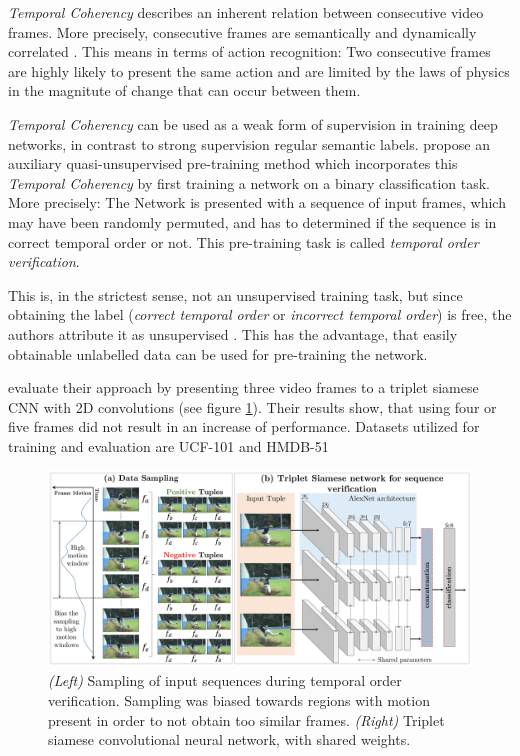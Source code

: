 \textit{Temporal Coherency} describes an inherent relation between consecutive video frames.
More precisely, consecutive frames are semantically and dynamically correlated \cite{herath_going_2016}.
This means in terms of action recognition: Two consecutive frames are highly likely to present the same action and are limited by the laws of physics in the magnitute of change that can occur between them.

\textit{Temporal Coherency} can be used as a weak form of supervision in training deep networks, in contrast to strong supervision regular semantic labels.
\textcite{misra_shuffle_2016} propose an auxiliary quasi-unsupervised pre-training method which incorporates this \textit{Temporal Coherency} by first training a network on a binary classification task.
More precisely: The Network is presented with a sequence of input frames, which may have been randomly permuted, and has to determined if the sequence is in correct temporal order or not.
This pre-training task is called \textit{temporal order verification}.

This is, in the strictest sense, not an unsupervised training task, but since obtaining the label (\textit{correct temporal order} or \textit{incorrect temporal order}) is free, the authors attribute it as unsupervised \cite{misra_shuffle_2016}.
This has the advantage, that easily obtainable unlabelled data can be used for pre-training the network.

\textcite{misra_shuffle_2016} evaluate their approach by presenting three video frames to a triplet siamese CNN with 2D convolutions (see figure \ref{fig:shufflelearn_approach}).
Their results show, that using four or five frames did not result in an increase of performance.
Datasets utilized for training and evaluation are UCF-101 \cite{??} and HMDB-51 \cite{??}

\begin{figure}[H]
    \centering
    \includegraphics[width=\textwidth]{img_related/shufflelearn_approach}
    \caption{\textit{(Left)} Sampling of input sequences during temporal order verification. Sampling was biased towards regions with motion present in order to not obtain too similar frames. \textit{(Right)} Triplet siamese convolutional neural network, with shared weights. \cite{misra_shuffle_2016}}
    \label{fig:shufflelearn_approach}
\end{figure}

